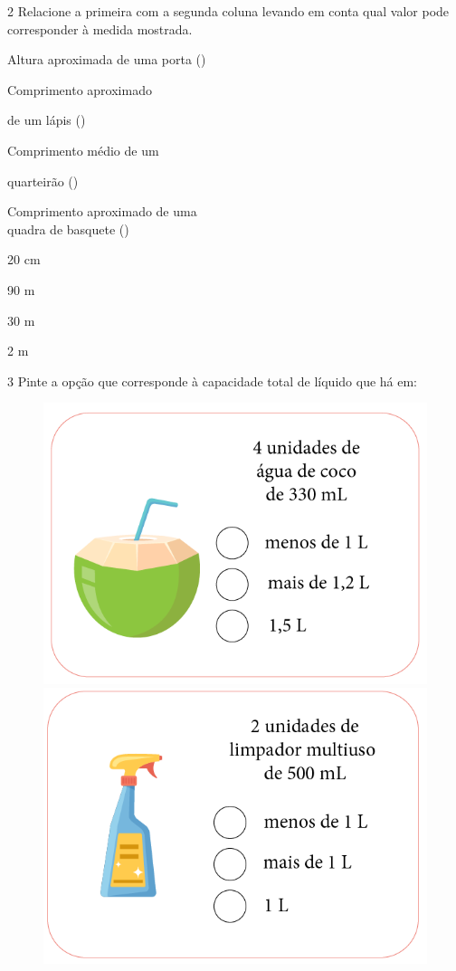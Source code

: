 \num{2} Relacione a primeira com a segunda coluna levando em conta qual
valor pode corresponder à medida mostrada.

\begin{multicols}{2}

\noindent{}Altura aproximada de uma porta ({})

\noindent{}Comprimento aproximado

\noindent{}de um lápis ({\rosa{20 cm}})

\noindent{}Comprimento médio de um

\noindent{} quarteirão ({})

\noindent{}Comprimento aproximado de uma\\ quadra de basquete ({})

\columnbreak

20 cm
 
90 m

30 m
 
2 m
\end{multicols}


\pagebreak

\num{3} Pinte a opção que corresponde à capacidade total de líquido que
há em:

\begin{figure}[htpb!]
\includegraphics[width=.5\textwidth]{../ilustracoes/MAT5/SAEB_5ANO_MAT_figura31.png}
\includegraphics[width=.5\textwidth]{../ilustracoes/MAT5/SAEB_5ANO_MAT_figura31a.png}
\end{figure}

